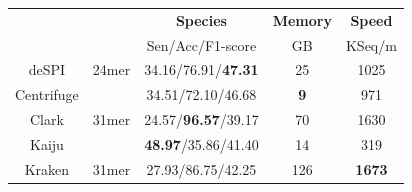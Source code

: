 \documentclass[a0,portrait]{a0poster}
\begin{document}
\begin{multicols}{2}
\begin{center}\vspace{1cm}
\footnotesize
\begin{tabular}{ccccc}
\toprule
& & \textbf{Species} & \textbf{Memory} & \textbf{Speed}\\
\cline{3-5}
& & Sen/Acc/F1-score & GB & KSeq/m\\
\midrule
deSPI & 24mer & 34.16/76.91/\textbf{47.31} & 25 & 1025\\
Centrifuge	 & & 34.51/72.10/46.68 & \textbf{9} & 971\\
Clark	 & 31mer & 24.57/\textbf{96.57}/39.17 & 70 & 1630\\
Kaiju	 & & \textbf{48.97}/35.86/41.40 & 14 & 319\\
Kraken & 31mer & 27.93/86.75/42.25 & 126 & \textbf{1673}\\
\bottomrule
\end{tabular}
\end{center}\vspace{1cm}
%

\end{multicols}
\end{document}
